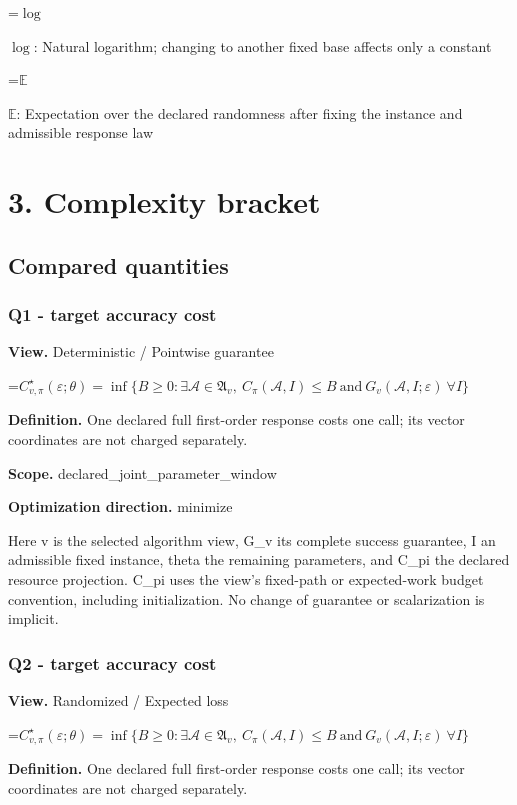 \documentclass[10pt,a4paper]{article}
\newcommand{\AtlasMath}[1]{\par\begingroup\centering\setbox0=\hbox{$\displaystyle #1$}\ifdim\wd0>1.4\linewidth\typeout{ATLAS WIDE FORMULA: \the\wd0}\fi\ifdim\wd0>\linewidth\resizebox{\linewidth}{!}{\box0}\else\box0\fi\par\endgroup}
\newcommand{\AtlasInlineMath}[1]{\begingroup\setbox0=\hbox{$#1$}\ifdim\wd0>.4\linewidth\endgroup\AtlasMath{#1}\else\endgroup$#1$\fi}
\begin{document}
\AtlasInlineMath{\log}: Natural logarithm; changing to another fixed base affects only a constant

\AtlasInlineMath{\mathbb{E}}: Expectation over the declared randomness after fixing the instance and admissible response law

\section{3. Complexity bracket}
\subsection{Compared quantities}
\subsubsection{Q1 - target accuracy cost}
\textbf{View.} Deterministic / Pointwise guarantee

\AtlasMath{C^\star_{v,\pi}(\varepsilon;\theta)=\inf\{B\ge0:\exists\mathcal A\in\mathfrak A_v,\ C_\pi(\mathcal A,I)\le B\ \text{and}\ G_v(\mathcal A,I;\varepsilon)\ \forall I\}}
\textbf{Definition.} One declared full first-order response costs one call; its vector coordinates are not charged separately.

\textbf{Scope.} declared\_joint\_parameter\_window

\textbf{Optimization direction.} minimize

Here v is the selected algorithm view, G\_v its complete success guarantee, I an admissible fixed instance, theta the remaining parameters, and C\_pi the declared resource projection. C\_pi uses the view's fixed-path or expected-work budget convention, including initialization. No change of guarantee or scalarization is implicit.

\subsubsection{Q2 - target accuracy cost}
\textbf{View.} Randomized / Expected loss

\AtlasMath{C^\star_{v,\pi}(\varepsilon;\theta)=\inf\{B\ge0:\exists\mathcal A\in\mathfrak A_v,\ C_\pi(\mathcal A,I)\le B\ \text{and}\ G_v(\mathcal A,I;\varepsilon)\ \forall I\}}
\textbf{Definition.} One declared full first-order response costs one call; its vector coordinates are not charged separately.
\end{document}
